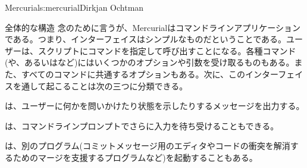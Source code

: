 \begin{aosachapter}{Mercurial}{s:mercurial}{Dirkjan Ochtman}
\begin{aosasect1}{全体的な構造}
念のために言うが、Mercurialはコマンドラインアプリケーションである。つまり、インターフェイスはシンプルなものだということである。ユーザーは、スクリプトにコマンドを指定して呼び出すことになる。各種コマンド(や、あるいはなど)にはいくつかのオプションや引数を受け取るものもある。また、すべてのコマンドに共通するオプションもある。次に、このインターフェイスを通して起こることは次の三つに分類できる。

\begin{aosaitemize}

  \item {}は、ユーザーに何かを問いかけたり状態を示したりするメッセージを出力する。

  \item {}は、コマンドラインプロンプトでさらに入力を待ち受けることもできる。

  \item {}は、別のプログラム(コミットメッセージ用のエディタやコードの衝突を解消するためのマージを支援するプログラムなど)を起動することもある。

\end{aosaitemize}



\end{aosasect1}
\end{aosachapter}
